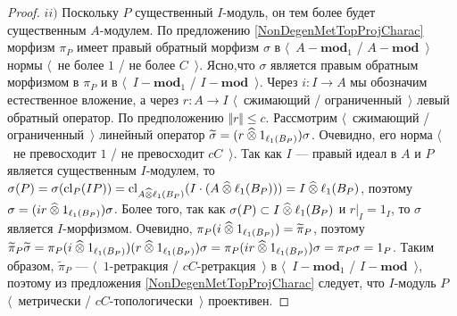 \begin{proof}
$ii)$ Поскольку $P$ существенный $I$-модуль, он тем более будет существенным $A$-модулем. По предложению \ref{NonDegenMetTopProjCharac} морфизм $\pi_P$ имеет правый обратный морфизм $\sigma$ в $\langle$~$A-\mathbf{mod}_1$ / $A-\mathbf{mod}$~$\rangle$ нормы $\langle$~не более $1$ / не более $C$~$\rangle$. Ясно,что $\sigma$ является правым обратным морфизмом в $\pi_P$ и в $\langle$~$I-\mathbf{mod}_1$ / $I-\mathbf{mod}$~$\rangle$. Через $i:I\to A$ мы обозначим естественное вложение, а через $r:A\to I$ $\langle$~сжимающий / ограниченный~$\rangle$ левый обратный оператор. По предположению $\Vert r\Vert\leq c$. Рассмотрим $\langle$~сжимающий / ограниченный~$\rangle$ линейный оператор $\widetilde{\sigma}=(r\mathbin{\widehat{\otimes}} 1_{\ell_1(B_P)})\sigma$. Очевидно, его норма $\langle$~не превосходит $1$ / не превосходит $cC$~$\rangle$. Так как $I$ --- правый идеал в $A$ и $P$ является существенным $I$-модулем, то $\sigma(P)=\sigma(\operatorname{cl}_P(IP))=\operatorname{cl}_{A\mathbin{\widehat{\otimes}} \ell_1(B_P)}(I\cdot (A\mathbin{\widehat{\otimes}} \ell_1(B_P)))=I\mathbin{\widehat{\otimes}} \ell_1(B_P)$, поэтому $\sigma=(ir\mathbin{\widehat{\otimes}} 1_{\ell_1(B_P)})\sigma$. Более того, так как $\sigma(P)\subset I\mathbin{\widehat{\otimes}}\ell_1(B_P)$ и $r|_I=1_I$, то $\sigma$ является $I$-морфизмом. Очевидно, $\pi_P(i\mathbin{\widehat{\otimes}} 1_{\ell_1(B_P)})=\widetilde{\pi}_P$, поэтому $\widetilde{\pi}_P\widetilde{\sigma}=\pi_P(i\mathbin{\widehat{\otimes}} 1_{\ell_1(B_P)})(r\mathbin{\widehat{\otimes}} 1_{\ell_1(B_P)})\sigma=\pi_P(ir\mathbin{\widehat{\otimes}} 1_{\ell_1(B_P)})\sigma=\pi_P\sigma=1_P$. Таким образом, $\widetilde{\pi}_P$ --- $\langle$~$1$-ретракция / $cC$-ретракция~$\rangle$ в $\langle$~$I-\mathbf{mod}_1$ / $I-\mathbf{mod}$~$\rangle$, поэтому из предложения \ref{NonDegenMetTopProjCharac} следует, что $I$-модуль $P$ $\langle$~метрически / $cC$-топологически~$\rangle$ проективен.
\end{proof}

